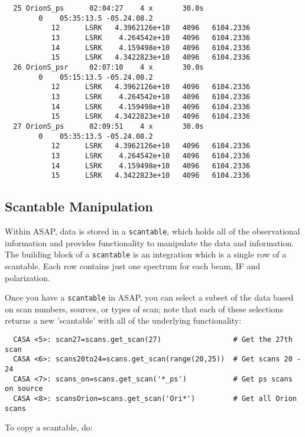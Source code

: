 \begin{verbatim}
  25 OrionS_ps      02:04:27    4 x       30.0s
        0    05:35:13.5 -05.24.08.2
           12      LSRK   4.3962126e+10   4096   6104.2336
           13      LSRK    4.264542e+10   4096   6104.2336
           14      LSRK    4.159498e+10   4096   6104.2336
           15      LSRK   4.3422823e+10   4096   6104.2336
  26 OrionS_psr     02:07:10    4 x       30.0s
        0    05:15:13.5 -05.24.08.2
           12      LSRK   4.3962126e+10   4096   6104.2336
           13      LSRK    4.264542e+10   4096   6104.2336
           14      LSRK    4.159498e+10   4096   6104.2336
           15      LSRK   4.3422823e+10   4096   6104.2336
  27 OrionS_ps      02:09:51    4 x       30.0s
        0    05:35:13.5 -05.24.08.2
           12      LSRK   4.3962126e+10   4096   6104.2336
           13      LSRK    4.264542e+10   4096   6104.2336
           14      LSRK    4.159498e+10   4096   6104.2336
           15      LSRK   4.3422823e+10   4096   6104.2336
\end{verbatim}
\normalsize


\subsection{Scantable Manipulation}
\label{subsection:sd.asap.scantable}

Within ASAP, data is stored in a {\tt scantable}, which holds all of the
observational information and provides functionality to manipulate the
data and information. The building block of a {\tt scantable} is an
integration which is a single row of a scantable. Each row contains
just one spectrum for each beam, IF and polarization.  

Once you have a {\tt scantable} in ASAP, you can select a subset of the
data based on scan numbers, sources, or types of scan; note that each
of these selections returns a new 'scantable' with all of the 
underlying functionality: 

\small
\begin{verbatim}
  CASA <5>: scan27=scans.get_scan(27)                 # Get the 27th scan
  CASA <6>: scans20to24=scans.get_scan(range(20,25))  # Get scans 20 - 24
  CASA <7>: scans_on=scans.get_scan('*_ps')           # Get ps scans on source
  CASA <8>: scansOrion=scans.get_scan('Ori*')         # Get all Orion scans
\end{verbatim}
\normalsize

To copy a scantable, do:

